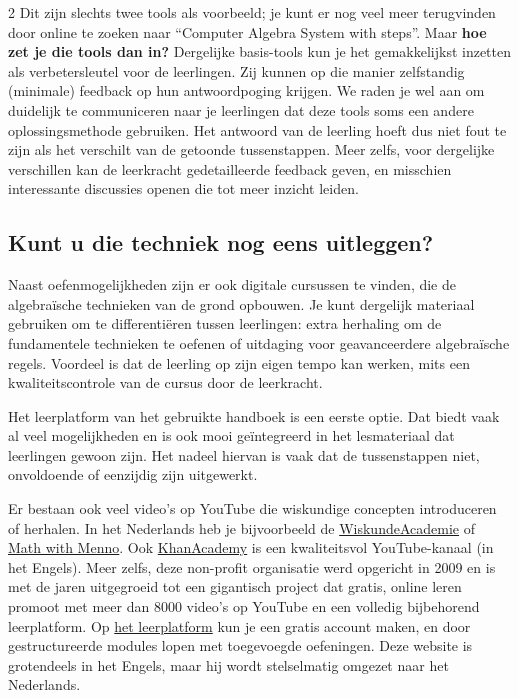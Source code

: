 \begin{multicols} {2}
    Dit zijn slechts twee tools als voorbeeld; je kunt er nog veel meer terugvinden door online te zoeken naar ``Computer Algebra System with steps''.
    Maar \textbf{hoe zet je die tools dan in?}
    Dergelijke basis-tools kun je het gemakkelijkst inzetten als verbetersleutel voor de leerlingen.
    Zij kunnen op die manier zelfstandig (minimale) feedback op hun antwoordpoging krijgen.
    We raden je wel aan om duidelijk te communiceren naar je leerlingen dat deze tools soms een andere oplossingsmethode gebruiken.
    Het antwoord van de leerling hoeft dus niet fout te zijn als het verschilt van de getoonde tussenstappen.
    Meer zelfs, voor dergelijke verschillen kan de leerkracht gedetailleerde feedback geven, en misschien interessante discussies openen die tot meer inzicht leiden.

    \subsection{Kunt u die techniek nog eens uitleggen?}
    Naast oefenmogelijkheden zijn er ook digitale cursussen te vinden, die de algebraïsche technieken van de grond opbouwen.
    Je kunt dergelijk materiaal gebruiken om te differentiëren tussen leerlingen: extra herhaling om de fundamentele technieken te oefenen of uitdaging voor geavanceerdere algebraïsche regels.
    Voordeel is dat de leerling op zijn eigen tempo kan werken, mits een kwaliteitscontrole van de cursus door de leerkracht.

    Het leerplatform van het gebruikte handboek is een eerste optie.
    Dat biedt vaak al veel mogelijkheden en is ook mooi geïntegreerd in het lesmateriaal dat leerlingen gewoon zijn.
    Het nadeel hiervan is vaak dat de tussenstappen niet, onvoldoende of eenzijdig zijn uitgewerkt.

    Er bestaan ook veel video's op YouTube die wiskundige concepten introduceren of herhalen.
    In het Nederlands heb je bijvoorbeeld de \href{https://www.youtube.com/watch?v=Utx1apbbuao}{WiskundeAcademie} of \href{https://www.youtube.com/watch?v=pjSZ2tvGbvA}{Math with Menno}.
    Ook \href{https://youtu.be/rR4FfB-FZJw?si=K42IUlAAXmSWXuyL}{KhanAcademy} is een kwaliteitsvol YouTube-kanaal (in het Engels). 
    Meer zelfs, deze non-profit organisatie werd opgericht in 2009 en is met de jaren uitgegroeid tot een gigantisch project dat gratis, online leren promoot met meer dan 8000 video's op YouTube en een volledig bijbehorend leerplatform.
    Op \href{https://www.khanacademy.org/math/algebra-basics/alg-basics-quadratics-and-polynomials}{het leerplatform} kun je een gratis account maken, en door gestructureerde modules lopen met toegevoegde oefeningen.
    Deze website is grotendeels in het Engels, maar hij wordt stelselmatig omgezet naar het Nederlands.
    

\end{multicols}
